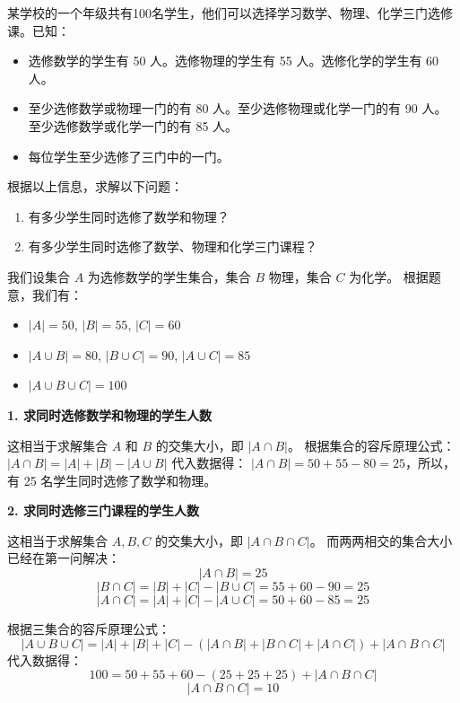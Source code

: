 \begin{example}
    某学校的一个年级共有100名学生，他们可以选择学习数学、物理、化学三门选修课。已知：
    \begin{itemize}
        \item 选修数学的学生有 50 人。选修物理的学生有 55 人。选修化学的学生有 60 人。
        \item 至少选修数学或物理一门的有 80 人。至少选修物理或化学一门的有 90 人。至少选修数学或化学一门的有 85 人。
        \item 每位学生至少选修了三门中的一门。
    \end{itemize}
    根据以上信息，求解以下问题：
    \begin{enumerate}
        \item 有多少学生同时选修了数学和物理？
        \item 有多少学生同时选修了数学、物理和化学三门课程？
    \end{enumerate}
\end{example}

\begin{solution}
    我们设集合 $A$ 为选修数学的学生集合，集合 $B$ 物理，集合 $C$ 为化学。
    根据题意，我们有：
    \begin{itemize}
        \item $|A| = 50$, $|B| = 55$, $|C| = 60$
        \item $|A \cup B| = 80$, $|B \cup C| = 90$, $|A \cup C| = 85$
        \item $|A \cup B \cup C| = 100$
    \end{itemize}

    \textbf{1. 求同时选修数学和物理的学生人数}

    这相当于求解集合 $A$ 和 $B$ 的交集大小，即 $|A \cap B|$。
    根据集合的容斥原理公式：
    $|A \cap B| = |A| + |B| - |A \cup B|$
    代入数据得：
    $|A \cap B| = 50 + 55 - 80 = 25$，所以，有 25 名学生同时选修了数学和物理。

    \textbf{2. 求同时选修三门课程的学生人数}

    这相当于求解集合 $A, B, C$ 的交集大小，即 $|A \cap B \cap C|$。
    而两两相交的集合大小已经在第一问解决：
    $$|A \cap B| = 25$$
    $$|B \cap C| = |B| + |C| - |B \cup C| = 55 + 60 - 90 = 25$$
    $$|A \cap C| = |A| + |C| - |A \cup C| = 50 + 60 - 85 = 25$$

    根据三集合的容斥原理公式：
    $$|A \cup B \cup C| = |A| + |B| + |C| - (|A \cap B| + |B \cap C| + |A \cap C|) + |A \cap B \cap C|$$
    代入数据得：
    $$100 = 50 + 55 + 60 - (25 + 25 + 25) + |A \cap B \cap C|$$
    $$|A \cap B \cap C| = 10$$
\end{solution}

